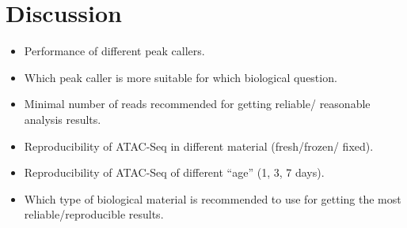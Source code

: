 \documentclass[11pt]{article}
\begin{document}
\section{Discussion}
\begin{itemize}
\itemsep0em
  \item Performance of different peak callers.
  \item Which peak caller is more suitable for which biological question.
  \item Minimal number of reads recommended for getting reliable/
        reasonable analysis results.
  \item Reproducibility of ATAC-Seq in different material (fresh/frozen/
        fixed).
  \item Reproducibility of ATAC-Seq of different ``age'' (1, 3, 7 days).
  \item Which type of biological material is recommended to use for
        getting the most reliable/reproducible results.	
\end{itemize}
\end{document}
